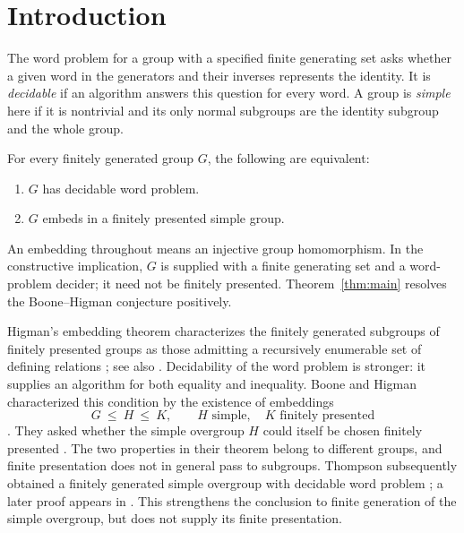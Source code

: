 \section{Introduction}\label{sec:introduction}

The word problem for a group with a specified finite generating set asks
whether a given word in the generators and their inverses represents the
identity. It is \emph{decidable} if an algorithm answers this question for
every word. A group is \emph{simple} here if it is nontrivial and its only
normal subgroups are the identity subgroup and the whole group.

\begin{theorem}\label{thm:main}
For every finitely generated group \(G\), the following are equivalent:
\begin{enumerate}[label=\textup{(\roman*)}]
\item \(G\) has decidable word problem.
\item \(G\) embeds in a finitely presented simple group.
\end{enumerate}
\end{theorem}

An embedding throughout means an injective group homomorphism. In the
constructive implication, \(G\) is supplied with a finite generating set
and a word-problem decider; it need not be finitely presented.
Theorem~\ref{thm:main} resolves the Boone--Higman conjecture positively.

Higman's embedding theorem characterizes the finitely generated
subgroups of finitely presented groups as those admitting a recursively
enumerable set of defining relations \cite{Higman61}; see also
\cite[Theorem~A]{AanderaaCohen1980}.
Decidability of the word problem is stronger: it supplies an algorithm
for both equality and inequality. Boone and Higman characterized this
condition by the existence of embeddings
\[
 G\ \leq\ H\ \leq\ K,
 \qquad H\text{ simple},\quad K\text{ finitely presented}
\]
\cite[Theorem~I]{BH74}. They asked whether the simple overgroup \(H\)
could itself be chosen finitely presented \cite[p.~43]{BH74}.
The two properties in their theorem belong to different groups, and
finite presentation does not in general pass to subgroups.
Thompson subsequently obtained a finitely generated simple overgroup
with decidable word problem \cite{Tho80}; a later proof appears in
\cite[Theorem~7.1]{DarbinyanSteenbock2022}.
This strengthens the conclusion to finite generation of the simple
overgroup, but does not supply its finite presentation.


